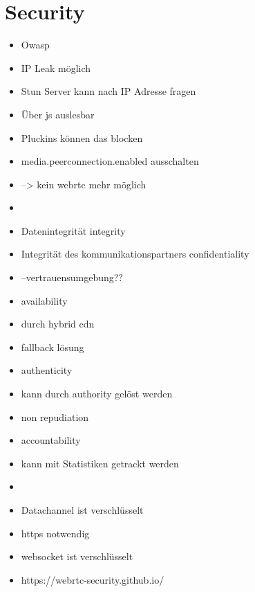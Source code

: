 \section{Security}
\begin{itemize}
	\item Owasp
	\item IP Leak möglich
	\item Stun Server kann nach IP Adresse fragen
	\item Über js auslesbar
	\item Pluckins können das blocken
	\item media.peerconnection.enabled ausschalten
	\item --> kein webrtc mehr möglich
	\item 
	\item Datenintegrität integrity
	\item Integrität des kommunikationspartners confidentiality
	\item 	--vertrauensumgebung??
	\item availability
	\item durch hybrid cdn 
	\item fallback lösung
	\item authenticity
	\item kann durch authority gelöst werden
	\item non repudiation
	\item accountability
	\item kann mit Statistiken getrackt werden
	\item 
	\item Datachannel ist verschlüsselt
	\item https notwendig
	\item websocket ist verschlüsselt
	\item https://webrtc-security.github.io/

\end{itemize}

